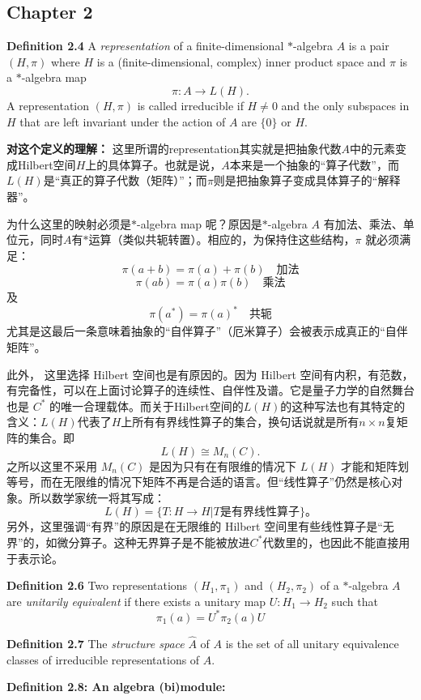 \subsection{Chapter 2}
\textbf{Definition 2.4} A \textit{representation} of a finite-dimensional $*$-algebra $A$ is a pair $(H,\pi)$ where $H$ is a (finite-dimensional, complex) inner product space and $\pi$ is a $*$-algebra map \[\pi:A\rightarrow L(H).\] A representation $(H,\pi)$ is called irreducible if $H\neq0$ and the only subspaces in $H$ that are left invariant under the action of $A$ are $\{0\}$ or $H$.

\textbf{对这个定义的理解：} 这里所谓的representation其实就是把抽象代数$A$中的元素变成Hilbert空间$H$上的具体算子。也就是说，$A$本来是一个抽象的“算子代数”，而$L(H)$是“真正的算子代数（矩阵）”；而$\pi$则是把抽象算子变成具体算子的“解释器”。

为什么这里的映射必须是$*$-algebra map 呢？原因是$*$-algebra $A$ 有加法、乘法、单位元，同时$A$有$*$运算（类似共轭转置）。相应的，为保持住这些结构，$\pi$ 就必须满足：\[\pi(a+b)=\pi(a)+\pi(b)\quad \text{加法}\] \[\pi(ab)=\pi(a)\pi(b)\quad \text{乘法}\]及\[\pi(a^*)=\pi(a)^* \quad\text{共轭}\] 尤其是这最后一条意味着抽象的“自伴算子”（厄米算子）会被表示成真正的“自伴矩阵”。

此外， 这里选择 Hilbert 空间也是有原因的。因为 Hilbert 空间有内积，有范数，有完备性，可以在上面讨论算子的连续性、自伴性及谱。它是量子力学的自然舞台也是 $C^*$ 的唯一合理载体。而关于Hilbert空间的$ L(H)$的这种写法也有其特定的含义：$ L(H)$代表了$H$上所有有界线性算子的集合，换句话说就是所有$n\times n$复矩阵的集合。即 \[L(H)\cong M_n(C).\] 之所以这里不采用 $M_n(C)$ 是因为只有在有限维的情况下 $L(H)$ 才能和矩阵划等号，而在无限维的情况下矩阵不再是合适的语言。但“线性算子”仍然是核心对象。所以数学家统一将其写成：\[L(H)=\{T:H\rightarrow H|T \text{是有界线性算子}\}。\]另外，这里强调“有界”的原因是在无限维的 Hilbert 空间里有些线性算子是“无界”的，如微分算子。这种无界算子是不能被放进$C^*$代数里的，也因此不能直接用于表示论。

\textbf{ Definition 2.6} Two representations $(H_1,\pi_1)$ and $(H_2,\pi_2)$ of a $*$-algebra $A$ are \textit{unitarily equivalent} if there exists a unitary map $U:H_1\rightarrow H_2$ such that \[\pi_1(a)=U^*\pi_2(a)U\]

\textbf{ Definition 2.7} The \textit{structure space} $\hat{A}$ of $A$ is the set of all unitary equivalence classes of irreducible representations of $A$.

\textbf{ Definition 2.8: An algebra (bi)module:}

